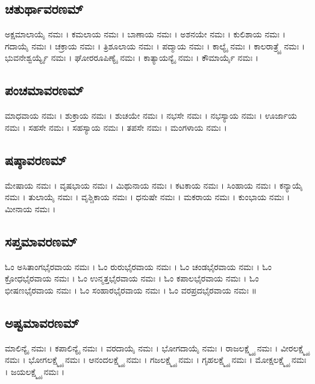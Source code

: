 \subsection{ಚತುರ್ಥಾವರಣಮ್}
ಅಕ್ಷಮಾಲಾಯೈ  ನಮಃ ।
ಕಮಲಾಯ  ನಮಃ ।
ಬಾಣಾಯ  ನಮಃ ।
ಅಶನಯೇ  ನಮಃ ।
ಕುಲಿಶಾಯ  ನಮಃ ।
ಗದಾಯೈ  ನಮಃ ।
ಚಕ್ರಾಯ  ನಮಃ ।
ತ್ರಿಶೂಲಾಯ  ನಮಃ ।
ಪದ್ಮಾಯ  ನಮಃ ।
ಕಾಲ್ಯೈ  ನಮಃ ।
ಕಾಲರಾತ್ರ್ಯೈ  ನಮಃ ।
ಭುವನೇಶ್ವರ್ಯ್ಯೈ  ನಮಃ ।
ಘೋರರೂಪಿಣ್ಯೈ  ನಮಃ ।
ಕಾತ್ಯಾಯನ್ಯೈ  ನಮಃ ।
ಕೌಮಾರ್ಯೈ  ನಮಃ ।\\
\subsection{ಪಂಚಮಾವರಣಮ್}
ಮಾಧವಾಯ  ನಮಃ ।
ಶುಕ್ರಾಯ  ನಮಃ ।
ಶುಚಯೇ  ನಮಃ ।
ನಭಸೇ  ನಮಃ ।
ನಭಸ್ಯಾಯ  ನಮಃ ।
ಊರ್ಜಾಯ  ನಮಃ ।
ಸಹಸೇ  ನಮಃ ।
ಸಹಸ್ಯಾಯ  ನಮಃ ।
ತಪಸೇ  ನಮಃ ।
ಮಂಗಳಾಯ  ನಮಃ ।\\
\subsection{ಷಷ್ಠಾವರಣಮ್}
ಮೇಷಾಯ  ನಮಃ ।
ವೃಷಭಾಯ  ನಮಃ ।
ಮಿಥುನಾಯ  ನಮಃ ।
ಕಟಕಾಯ  ನಮಃ ।
ಸಿಂಹಾಯ  ನಮಃ ।
ಕನ್ಯಾಯೈ  ನಮಃ ।
ತುಲಾಯೈ  ನಮಃ ।
ವೃಶ್ಚಿಕಾಯ  ನಮಃ ।
ಧನುಷೇ  ನಮಃ ।
ಮಕರಾಯ  ನಮಃ ।
ಕುಂಭಾಯ  ನಮಃ ।
ಮೀನಾಯ  ನಮಃ ।\\
\subsection{ಸಪ್ತಮಾವರಣಮ್}
ಓಂ ಅಸಿತಾಂಗಭೈರವಾಯ ನಮಃ । ಓಂ ರುರುಭೈರವಾಯ ನಮಃ । ಓಂ ಚಂಡಭೈರವಾಯ ನಮಃ । ಓಂ ಕ್ರೋಧಭೈರವಾಯ ನಮಃ । ಓಂ ಉನ್ಮತ್ತಭೈರವಾಯ ನಮಃ । ಓಂ ಕಪಾಲಭೈರವಾಯ ನಮಃ । ಓಂ ಭೀಷಣಭೈರವಾಯ ನಮಃ । ಓಂ ಸಂಹಾರಭೈರವಾಯ ನಮಃ । ಓಂ ವರಪ್ರದಭೈರವಾಯ ನಮಃ ॥\\
\subsection{ಅಷ್ಟಮಾವರಣಮ್}
ಮಾಲಿನ್ಯೈ  ನಮಃ ।
ಕಪಾಲಿನ್ಯೈ  ನಮಃ ।
ವರದಾಯೈ  ನಮಃ ।
ಭೋಗದಾಯೈ  ನಮಃ ।
ರಾಜಲಕ್ಷ್ಮ್ಯೈ  ನಮಃ ।
ವೀರಲಕ್ಷ್ಮ್ಯೈ  ನಮಃ ।
ಭೋಗಲಕ್ಷ್ಮ್ಯೈ  ನಮಃ ।
ಆನಂದಲಕ್ಷ್ಮ್ಯೈ  ನಮಃ ।
ಗಜಲಕ್ಷ್ಮ್ಯೈ  ನಮಃ ।
ಗೃಹಲಕ್ಷ್ಮ್ಯೈ  ನಮಃ ।
ಮೋಕ್ಷಲಕ್ಷ್ಮ್ಯೈ  ನಮಃ ।
ಜಯಲಕ್ಷ್ಮ್ಯೈ  ನಮಃ ।\\
